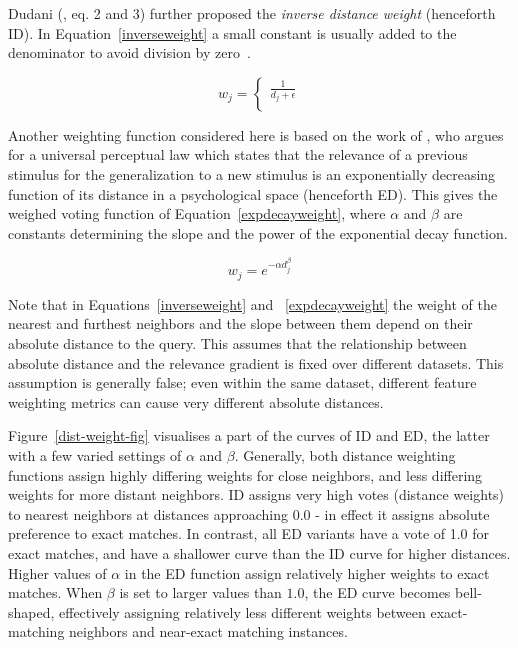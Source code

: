 \documentclass{book}
\begin{document}
Dudani (, eq. 2 and 3) further proposed the {\em inverse
distance weight} (henceforth ID). In Equation~\ref{inverseweight} a
small constant is usually added to the denominator to avoid division
by zero~\cite{Wettschereck94}.

\begin{equation}
\label{inverseweight}
w_{j}= \left \{ \begin{array}{ll}  
                        \frac{1}{d_{j} + \epsilon} \\ 
                    \end{array} 
          \right. 
\end{equation}

Another weighting function considered here is based on the work of
, who argues for a universal perceptual law which
states that the relevance of a previous stimulus for the
generalization to a new stimulus is an exponentially decreasing
function of its distance in a psychological space (henceforth
ED). This gives the weighed voting function of
Equation~\ref{expdecayweight}, where $\alpha$ and $\beta$ are
constants determining the slope and the power of the exponential decay
function.

\begin{equation}
\label{expdecayweight}
w_{j}= e^{-\alpha d_{j}^\beta}
\end{equation}

Note that in Equations~\ref{inverseweight} and ~\ref{expdecayweight}
the weight of the nearest and furthest neighbors and the slope between
them depend on their absolute distance to the query. This assumes that
the relationship between absolute distance and the relevance gradient
is fixed over different datasets. This assumption is generally false;
even within the same dataset, different feature weighting metrics can
cause very different absolute distances. 

Figure~\ref{dist-weight-fig} visualises a part of the curves of ID and
ED, the latter with a few varied settings of $\alpha$ and
$\beta$. Generally, both distance weighting functions assign highly
differing weights for close neighbors, and less differing weights for
more distant neighbors. ID assigns very high votes (distance weights)
to nearest neighbors at distances approaching 0.0 - in effect it
assigns absolute preference to exact matches. In contrast, all ED
variants have a vote of 1.0 for exact matches, and have a shallower
curve than the ID curve for higher distances. Higher values of
$\alpha$ in the ED function assign relatively higher weights to exact
matches. When $\beta$ is set to larger values than $1.0$, the ED curve
becomes bell-shaped, effectively assigning relatively less different
weights between exact-matching neighbors and near-exact matching
instances.
\end{document}
